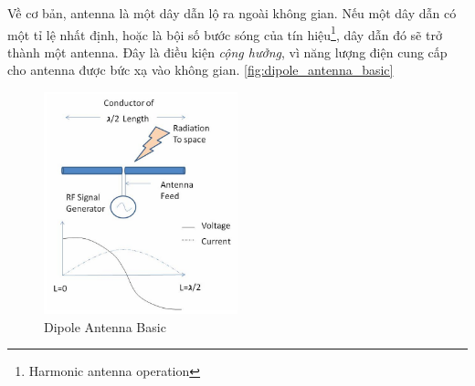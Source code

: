         Về cơ bản, antenna là một dây dẫn lộ ra ngoài không gian. Nếu một dây dẫn có một tỉ lệ nhất định,
        hoặc là bội số bước sóng của tín hiệu\footnote{Harmonic antenna operation}, dây dẫn đó sẽ trở thành một antenna.
        Đây là điều kiện \textit{cộng hưởng}, vì năng lượng điện cung cấp cho antenna được bức xạ vào không gian.\cite{Infineon2023_rflayout}
        \autoref{fig:dipole_antenna_basic}
        \begin{figure}[h]
            \centering
            \includegraphics[width=0.5\textwidth]{figures/dipole_antenna_basic.png}
            \caption{Dipole Antenna Basic}
            \label{fig:dipole_antenna_basic}
        \end{figure}